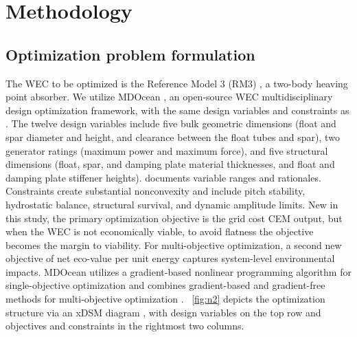 \documentclass[10pt,twoside]{article}
\begin{document}

\section{Methodology}
\subsection{Optimization problem formulation}
The WEC to be optimized is the Reference Model 3 (RM3) \cite{neary_reference_2014}, a two-body heaving point absorber.
We utilize MDOcean \cite{mccabe_mdocean_2024}, an open-source WEC multidisciplinary design optimization framework, with the same design variables and constraints as \cite{mccabe_leveraging_2025}.
The twelve design variables include five bulk geometric dimensions (float and spar diameter and height, and clearance between the float tubes and spar), two generator ratings (maximum power and maximum force), and five structural dimensions (float, spar, and damping plate material thicknesses, and float and damping plate stiffener heights).
\cite{mccabe_leveraging_2025} documents variable ranges and rationales.
Constraints create substantial nonconvexity and include pitch stability, hydrostatic balance, structural survival, and dynamic amplitude limits.
New in this study, the primary optimization objective is the grid cost CEM output, but when the WEC is not economically viable, to avoid flatness the objective becomes the margin to viability.
For multi-objective optimization, a second new objective of net eco-value per unit energy captures system-level environmental impacts.
MDOcean utilizes a gradient-based nonlinear programming algorithm for single-objective optimization and combines gradient-based and gradient-free methods for multi-objective optimization \cite{mccabe_leveraging_2025}.
\figureautorefname~\ref{fig:n2} depicts the optimization structure via an xDSM diagram \cite{lambe_extensions_2012}, with design variables on the top row and objectives and constraints in the rightmost two columns.
\end{document}
